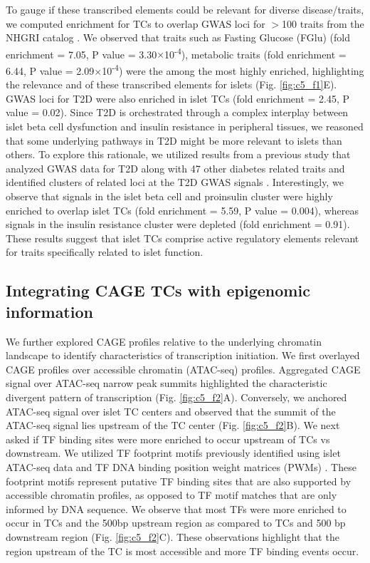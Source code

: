 To gauge if these transcribed elements could be relevant for diverse disease/traits, we computed enrichment for TCs to overlap GWAS loci for $>$100 traits from the NHGRI catalog \cite{bunielloNHGRIEBIGWASCatalog2019}. We observed that traits such as Fasting Glucose (FGlu) (fold enrichment = 7.05, P value = 3.30$\times$10\textsuperscript{-4}), metabolic traits (fold enrichment = 6.44, P value = 2.09$\times$10\textsuperscript{-4}) were the among the most highly enriched, highlighting the relevance and of these transcribed elements for islets (Fig. \ref{fig:c5_f1}E). GWAS loci for T2D were also enriched in islet TCs (fold enrichment = 2.45, P value = 0.02). Since T2D is orchestrated through a complex interplay between islet beta cell dysfunction and insulin resistance in peripheral tissues, we reasoned that some underlying pathways in T2D might be more relevant to islets than others. To explore this rationale, we utilized results from a previous study that analyzed GWAS data for T2D along with 47 other diabetes related traits and identified clusters of related loci at the  T2D GWAS signals \cite{udlerTypeDiabetesGenetic2018}. Interestingly, we observe that signals in the islet beta cell and proinsulin cluster were highly enriched to overlap islet TCs (fold enrichment = 5.59, P value = 0.004), whereas signals in the insulin resistance cluster were depleted (fold enrichment = 0.91). These results suggest that islet TCs comprise active regulatory elements relevant for traits specifically related to islet function.
    
\subsection{Integrating CAGE TCs with epigenomic information}
We further explored CAGE profiles relative to the underlying chromatin landscape to identify characteristics of transcription initiation. We first overlayed CAGE profiles over accessible chromatin (ATAC-seq) profiles. Aggregated CAGE signal over ATAC-seq narrow peak summits highlighted the characteristic divergent pattern of transcription (Fig. \ref{fig:c5_f2}A). Conversely, we anchored ATAC-seq signal over islet TC centers and observed that the summit of the ATAC-seq signal lies upstream of the TC center (Fig. \ref{fig:c5_f2}B). We next asked if TF binding sites were more enriched to occur upstream of TCs vs downstream. We utilized TF footprint motifs previously identified using islet ATAC-seq data and TF DNA binding position weight matrices (PWMs) \cite{varshneyGeneticRegulatorySignatures2017}. These footprint motifs represent putative TF binding sites that are also supported by accessible chromatin profiles, as opposed to TF motif matches that are only informed by DNA sequence. We observe that most TFs were more enriched to occur in TCs and the 500bp upstream region as compared to TCs and 500 bp downstream region (Fig. \ref{fig:c5_f2}C). These observations highlight that the region upstream of the TC is most accessible and more TF binding events occur. 


